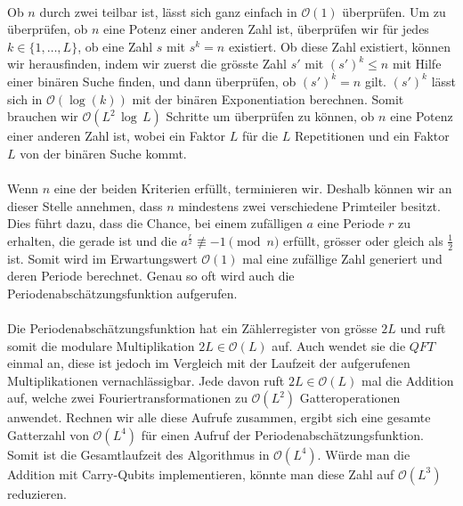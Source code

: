 \paragraph{}

Ob $n$ durch zwei teilbar ist, lässt sich ganz einfach in $\mathcal O(1)$ überprüfen. Um zu überprüfen, ob $n$ eine Potenz einer anderen Zahl ist, überprüfen wir für jedes $k \in \{1, \dots, L\}$, ob eine Zahl $s$ mit $s^k = n$ existiert. Ob diese Zahl existiert, können wir herausfinden, indem wir zuerst die grösste Zahl $s'$ mit $(s')^k \leq n$ mit Hilfe einer binären Suche finden, und dann überprüfen, ob $(s')^k = n$ gilt. $(s')^k$ lässt sich in $\mathcal{O}(\log(k))$ mit der binären Exponentiation berechnen. Somit brauchen wir $\mathcal{O}(L^2 \, \log \, L)$ Schritte um überprüfen zu können, ob $n$ eine Potenz einer anderen Zahl ist, wobei ein Faktor $L$ für die $L$ Repetitionen und ein Faktor $L$ von der binären Suche kommt.

\paragraph{}
Wenn $n$ eine der beiden Kriterien erfüllt, terminieren wir. Deshalb können wir an dieser Stelle annehmen, dass $n$ mindestens zwei verschiedene Primteiler besitzt. Dies führt dazu, dass die Chance, bei einem zufälligen $a$ eine Periode $r$ zu erhalten, die gerade ist und die $a^\frac{r}{2} \not\equiv -1 \pmod{n}$ erfüllt, grösser oder gleich als $\frac{1}{2}$ ist. Somit wird im Erwartungswert $\mathcal O(1)$ mal eine zufällige Zahl generiert und deren Periode berechnet. Genau so oft wird auch die Periodenabschätzungsfunktion aufgerufen. 

\paragraph{}
Die Periodenabschätzungsfunktion hat ein Zählerregister von grösse $2L$ und ruft somit die modulare Multiplikation $2L \in \mathcal O(L)$ auf. Auch wendet sie die $QFT$ einmal an, diese ist jedoch im Vergleich mit der Laufzeit der aufgerufenen Multiplikationen vernachlässigbar. Jede davon ruft $2L \in \mathcal O(L)$ mal die Addition auf, welche zwei Fouriertransformationen zu $\mathcal O(L^2)$ Gatteroperationen anwendet. Rechnen wir alle diese Aufrufe zusammen, ergibt sich eine gesamte Gatterzahl von $\mathcal O(L^4)$ für einen Aufruf der Periodenabschätzungsfunktion. Somit ist die Gesamtlaufzeit des Algorithmus in $\mathcal O(L^4)$. Würde man die Addition mit Carry-Qubits implementieren, könnte man diese Zahl auf $\mathcal O(L^3)$ reduzieren.

